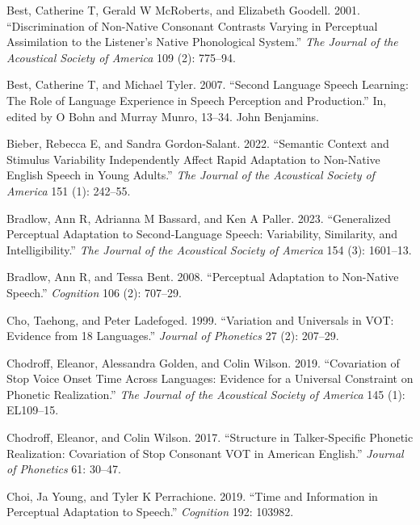 \documentclass[
  preprint]{elsarticle}
\newlength{\cslhangindent}
\newlength{\cslentryspacingunit} %
\newenvironment{CSLReferences}[2] %
 {%
  \setlength{\parindent}{0pt}
  \ifodd #1
  \let\oldpar\par
  \def\par{\hangindent=\cslhangindent\oldpar}
  \fi
  \setlength{\parskip}{#2\cslentryspacingunit}
 }%
 {}
\begin{document}
\begin{CSLReferences}{1}{0}
\leavevmode{}%
Best, Catherine T, Gerald W McRoberts, and Elizabeth Goodell. 2001. {``Discrimination of Non-Native Consonant Contrasts Varying in Perceptual Assimilation to the Listener's Native Phonological System.''} \emph{The Journal of the Acoustical Society of America} 109 (2): 775--94.

\leavevmode{}%
Best, Catherine T, and Michael Tyler. 2007. {``Second Language Speech Learning: The Role of Language Experience in Speech Perception and Production.''} In, edited by O Bohn and Murray Munro, 13--34. John Benjamins.

\leavevmode{}%
Bieber, Rebecca E, and Sandra Gordon-Salant. 2022. {``Semantic Context and Stimulus Variability Independently Affect Rapid Adaptation to Non-Native English Speech in Young Adults.''} \emph{The Journal of the Acoustical Society of America} 151 (1): 242--55.

\leavevmode{}%
Bradlow, Ann R, Adrianna M Bassard, and Ken A Paller. 2023. {``Generalized Perceptual Adaptation to Second-Language Speech: Variability, Similarity, and Intelligibility.''} \emph{The Journal of the Acoustical Society of America} 154 (3): 1601--13.

\leavevmode{}%
Bradlow, Ann R, and Tessa Bent. 2008. {``Perceptual Adaptation to Non-Native Speech.''} \emph{Cognition} 106 (2): 707--29.

\leavevmode{}%
Cho, Taehong, and Peter Ladefoged. 1999. {``Variation and Universals in {VOT}: Evidence from 18 Languages.''} \emph{Journal of Phonetics} 27 (2): 207--29.

\leavevmode{}%
Chodroff, Eleanor, Alessandra Golden, and Colin Wilson. 2019. {``Covariation of Stop Voice Onset Time Across Languages: Evidence for a Universal Constraint on Phonetic Realization.''} \emph{The Journal of the Acoustical Society of America} 145 (1): EL109--15.

\leavevmode{}%
Chodroff, Eleanor, and Colin Wilson. 2017. {``Structure in Talker-Specific Phonetic Realization: Covariation of Stop Consonant {VOT in American English}.''} \emph{Journal of Phonetics} 61: 30--47.

\leavevmode{}%
Choi, Ja Young, and Tyler K Perrachione. 2019. {``Time and Information in Perceptual Adaptation to Speech.''} \emph{Cognition} 192: 103982.


\end{CSLReferences}
\end{document}
